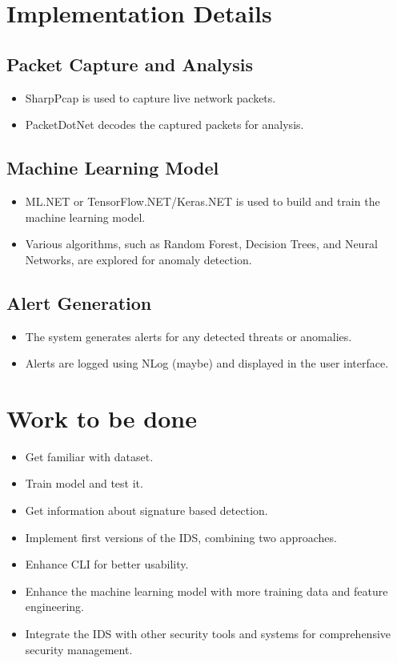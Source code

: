 \documentclass{article}
\begin{document}
\section{Implementation Details}
    \subsection{Packet Capture and Analysis}
        \begin{itemize}
            \item SharpPcap is used to capture live network packets.
            \item PacketDotNet decodes the captured packets for analysis.
        \end{itemize}

    \subsection{Machine Learning Model}
        \begin{itemize}
            \item ML.NET or TensorFlow.NET/Keras.NET is used to build and train the machine learning model.
            \item Various algorithms, such as Random Forest, Decision Trees, and Neural Networks, are explored for anomaly detection.
        \end{itemize}

    \subsection{Alert Generation}
        \begin{itemize}
            \item The system generates alerts for any detected threats or anomalies.
            \item Alerts are logged using NLog (maybe) and displayed in the user interface.
        \end{itemize}

\section{Work to be done}
    \begin{itemize}
        \item Get familiar with dataset.
        \item Train model and test it.
        \item Get information about signature based detection.
        \item Implement first versions of the IDS, combining two approaches.
        \item Enhance CLI for better usability.
        \item Enhance the machine learning model with more training data and feature engineering.
        \item Integrate the IDS with other security tools and systems for comprehensive security management.
    \end{itemize}
\end{document}
